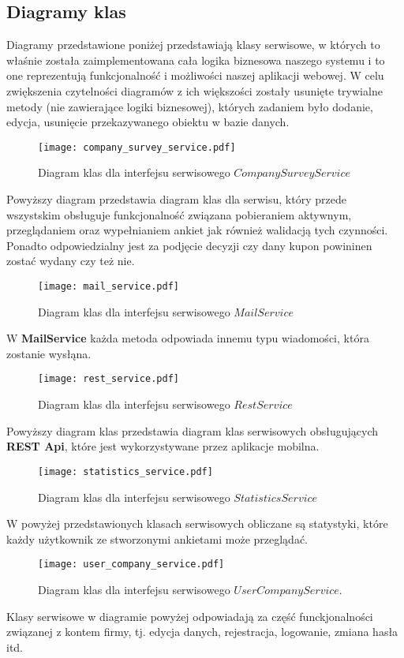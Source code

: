 \subsection{Diagramy klas}
Diagramy przedstawione poniżej przedstawiają klasy serwisowe, w których to właśnie została zaimplementowana cała logika biznesowa naszego systemu  i to one reprezentują funkcjonalność i możliwości naszej aplikacji webowej. W celu zwiększenia czytelności diagramów z ich większości zostały usunięte trywialne metody (nie zawierające logiki biznesowej), których zadaniem było dodanie, edycja, usunięcie przekazywanego obiektu w bazie danych.
\begin{figure}[H]
  \centering
  \texttt{[image: company\_survey\_service.pdf]}
  \caption{Diagram klas dla interfejsu serwisowego $CompanySurveyService$}
\end{figure}
Powyższy diagram przedstawia diagram klas dla serwisu, który przede wszystskim obsługuje funkcjonalność związana pobieraniem aktywnym, przeglądaniem oraz wypełnianiem ankiet jak również walidacją tych czynności. Ponadto odpowiedzialny jest za podjęcie decyzji czy dany kupon powininen zostać wydany czy też nie.
\begin{figure}[H]
  \centering
  \texttt{[image: mail\_service.pdf]}
  \caption{Diagram klas dla interfejsu serwisowego $MailService$}
\end{figure}
W \textbf{MailService} każda metoda odpowiada innemu typu  wiadomości, która zostanie wysłąna.
\begin{figure}[H]
  \centering
  \texttt{[image: rest\_service.pdf]}
  \caption{Diagram klas dla interfejsu serwisowego $RestService$}
\end{figure}
Powyższy diagram klas przedstawia diagram klas serwisowych obsługujących \textbf{REST Api}, które jest wykorzystywane przez aplikacje mobilna.
\begin{figure}[H]
  \centering
  \texttt{[image: statistics\_service.pdf]}
  \caption{Diagram klas dla interfejsu serwisowego $StatisticsService$}
\end{figure}
W powyżej przedstawionych klasach serwisowych obliczane są statystyki, które każdy użytkownik ze stworzonymi ankietami może przeglądać.
\begin{figure}[H]
  \centering
  \texttt{[image: user\_company\_service.pdf]}
  \caption{Diagram klas dla interfejsu serwisowego $UserCompanyService$.}
\end{figure}
Klasy serwisowe w diagramie powyżej odpowiadają za część funckjonalności związanej z kontem firmy, tj. edycja danych, rejestracja, logowanie, zmiana hasła itd.
